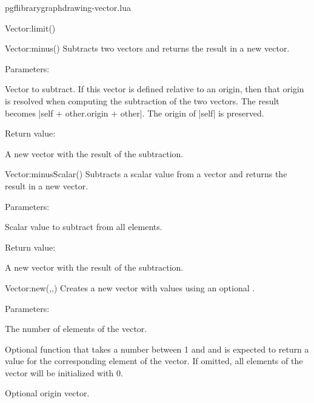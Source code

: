 \begin{filedescription}{pgflibrarygraphdrawing-vector.lua}
\begin{luacommand}{{Vector:limit}()}
\end{luacommand}
\begin{luacommand}{{Vector:minus}()}
Subtracts two vectors and returns the result in a new vector. 

Parameters:
\begin{parameterdescription}
	\item[\meta{other}] Vector to subtract. If this vector is defined relative to an origin, then that origin is resolved when computing the subtraction of the two vectors. The result becomes |self + other.origin + other|. The origin of |self| is preserved. 
\end{parameterdescription}


Return value:
\begin{parameterdescription} 
  \item[] A new vector with the result of the subtraction. 
\end{parameterdescription}


\end{luacommand}
\begin{luacommand}{{Vector:minusScalar}()}
Subtracts a scalar value from a vector and returns the result in a new vector. 

Parameters:
\begin{parameterdescription}
	\item[\meta{scalar}] Scalar value to subtract from all elements. 
\end{parameterdescription}


Return value:
\begin{parameterdescription} 
  \item[] A new vector with the result of the subtraction. 
\end{parameterdescription}


\end{luacommand}
\begin{luacommand}{{Vector:new}(,,)}
Creates a new vector with  values using an optional . 

Parameters:
\begin{parameterdescription}
	\item[\meta{n}] The number of elements of the vector.\item[\meta{fill\_function}] Optional function that takes a number between 1 and  and is expected to return a value for the corresponding element of the vector. If omitted, all elements of the vector will be initialized with 0.\item[\meta{origin}] Optional origin vector. 
\end{parameterdescription}



\end{luacommand}
\end{filedescription}
